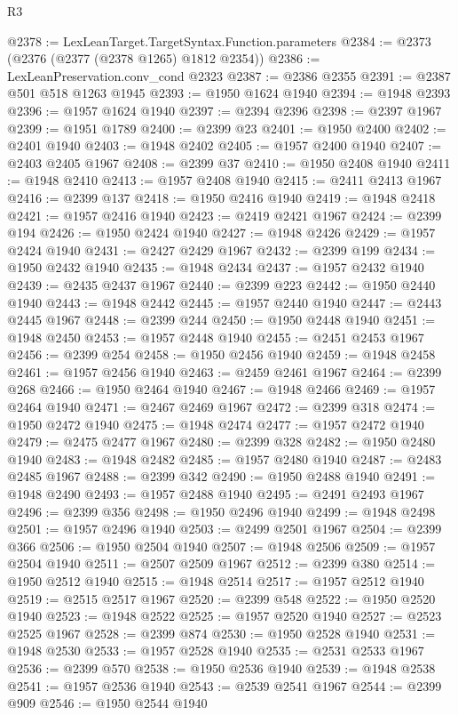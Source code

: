 \begin{lexlean}{R3}
\begin{coremodule}
@2378 := LexLeanTarget.TargetSyntax.Function.parameters
@2384 := @2373 (@2376 (@2377 (@2378 @1265) @1812 @2354))
@2386 := LexLeanPreservation.conv_cond @2323
@2387 := @2386 @2355
@2391 := @2387 @501 @518 @1263 @1945
@2393 := @1950 @1624 @1940
@2394 := @1948 @2393
@2396 := @1957 @1624 @1940
@2397 := @2394 @2396
@2398 := @2397 @1967
@2399 := @1951 @1789
@2400 := @2399 @23
@2401 := @1950 @2400
@2402 := @2401 @1940
@2403 := @1948 @2402
@2405 := @1957 @2400 @1940
@2407 := @2403 @2405 @1967
@2408 := @2399 @37
@2410 := @1950 @2408 @1940
@2411 := @1948 @2410
@2413 := @1957 @2408 @1940
@2415 := @2411 @2413 @1967
@2416 := @2399 @137
@2418 := @1950 @2416 @1940
@2419 := @1948 @2418
@2421 := @1957 @2416 @1940
@2423 := @2419 @2421 @1967
@2424 := @2399 @194
@2426 := @1950 @2424 @1940
@2427 := @1948 @2426
@2429 := @1957 @2424 @1940
@2431 := @2427 @2429 @1967
@2432 := @2399 @199
@2434 := @1950 @2432 @1940
@2435 := @1948 @2434
@2437 := @1957 @2432 @1940
@2439 := @2435 @2437 @1967
@2440 := @2399 @223
@2442 := @1950 @2440 @1940
@2443 := @1948 @2442
@2445 := @1957 @2440 @1940
@2447 := @2443 @2445 @1967
@2448 := @2399 @244
@2450 := @1950 @2448 @1940
@2451 := @1948 @2450
@2453 := @1957 @2448 @1940
@2455 := @2451 @2453 @1967
@2456 := @2399 @254
@2458 := @1950 @2456 @1940
@2459 := @1948 @2458
@2461 := @1957 @2456 @1940
@2463 := @2459 @2461 @1967
@2464 := @2399 @268
@2466 := @1950 @2464 @1940
@2467 := @1948 @2466
@2469 := @1957 @2464 @1940
@2471 := @2467 @2469 @1967
@2472 := @2399 @318
@2474 := @1950 @2472 @1940
@2475 := @1948 @2474
@2477 := @1957 @2472 @1940
@2479 := @2475 @2477 @1967
@2480 := @2399 @328
@2482 := @1950 @2480 @1940
@2483 := @1948 @2482
@2485 := @1957 @2480 @1940
@2487 := @2483 @2485 @1967
@2488 := @2399 @342
@2490 := @1950 @2488 @1940
@2491 := @1948 @2490
@2493 := @1957 @2488 @1940
@2495 := @2491 @2493 @1967
@2496 := @2399 @356
@2498 := @1950 @2496 @1940
@2499 := @1948 @2498
@2501 := @1957 @2496 @1940
@2503 := @2499 @2501 @1967
@2504 := @2399 @366
@2506 := @1950 @2504 @1940
@2507 := @1948 @2506
@2509 := @1957 @2504 @1940
@2511 := @2507 @2509 @1967
@2512 := @2399 @380
@2514 := @1950 @2512 @1940
@2515 := @1948 @2514
@2517 := @1957 @2512 @1940
@2519 := @2515 @2517 @1967
@2520 := @2399 @548
@2522 := @1950 @2520 @1940
@2523 := @1948 @2522
@2525 := @1957 @2520 @1940
@2527 := @2523 @2525 @1967
@2528 := @2399 @874
@2530 := @1950 @2528 @1940
@2531 := @1948 @2530
@2533 := @1957 @2528 @1940
@2535 := @2531 @2533 @1967
@2536 := @2399 @570
@2538 := @1950 @2536 @1940
@2539 := @1948 @2538
@2541 := @1957 @2536 @1940
@2543 := @2539 @2541 @1967
@2544 := @2399 @909
@2546 := @1950 @2544 @1940

\end{coremodule}
\end{lexlean}
